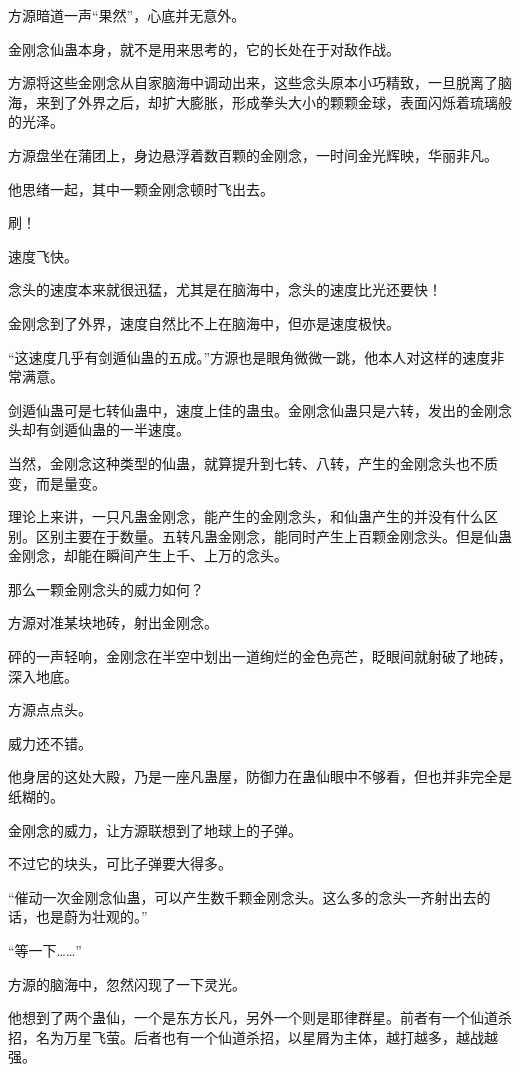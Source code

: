 \begin{this_body}
方源暗道一声“果然”，心底并无意外。

金刚念仙蛊本身，就不是用来思考的，它的长处在于对敌作战。

方源将这些金刚念从自家脑海中调动出来，这些念头原本小巧精致，一旦脱离了脑海，来到了外界之后，却扩大膨胀，形成拳头大小的颗颗金球，表面闪烁着琉璃般的光泽。

方源盘坐在蒲团上，身边悬浮着数百颗的金刚念，一时间金光辉映，华丽非凡。

他思绪一起，其中一颗金刚念顿时飞出去。

刷！

速度飞快。

念头的速度本来就很迅猛，尤其是在脑海中，念头的速度比光还要快！

金刚念到了外界，速度自然比不上在脑海中，但亦是速度极快。

“这速度几乎有剑遁仙蛊的五成。”方源也是眼角微微一跳，他本人对这样的速度非常满意。

剑遁仙蛊可是七转仙蛊中，速度上佳的蛊虫。金刚念仙蛊只是六转，发出的金刚念头却有剑遁仙蛊的一半速度。

当然，金刚念这种类型的仙蛊，就算提升到七转、八转，产生的金刚念头也不质变，而是量变。

理论上来讲，一只凡蛊金刚念，能产生的金刚念头，和仙蛊产生的并没有什么区别。区别主要在于数量。五转凡蛊金刚念，能同时产生上百颗金刚念头。但是仙蛊金刚念，却能在瞬间产生上千、上万的念头。

那么一颗金刚念头的威力如何？

方源对准某块地砖，射出金刚念。

砰的一声轻响，金刚念在半空中划出一道绚烂的金色亮芒，眨眼间就射破了地砖，深入地底。

方源点点头。

威力还不错。

他身居的这处大殿，乃是一座凡蛊屋，防御力在蛊仙眼中不够看，但也并非完全是纸糊的。

金刚念的威力，让方源联想到了地球上的子弹。

不过它的块头，可比子弹要大得多。

“催动一次金刚念仙蛊，可以产生数千颗金刚念头。这么多的念头一齐射出去的话，也是蔚为壮观的。”

“等一下……”

方源的脑海中，忽然闪现了一下灵光。

他想到了两个蛊仙，一个是东方长凡，另外一个则是耶律群星。前者有一个仙道杀招，名为万星飞萤。后者也有一个仙道杀招，以星屑为主体，越打越多，越战越强。


\end{this_body}
